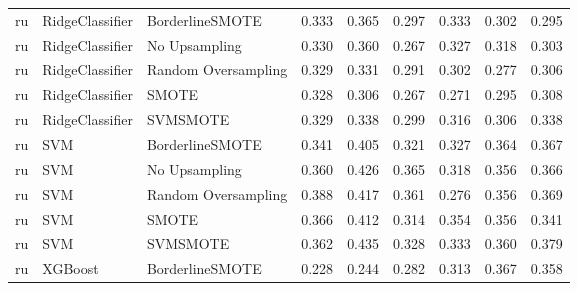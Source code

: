 \begin{tabular}{lllllllll}
      ru &              RidgeClassifier &     BorderlineSMOTE & 0.333 &                     0.365 &                 0.297 &                  0.333 &                                   0.302 &     0.295 \\
      ru &              RidgeClassifier &       No Upsampling & 0.330 &                     0.360 &                 0.267 &                  0.327 &                                   0.318 &     0.303 \\
      ru &              RidgeClassifier & Random Oversampling & 0.329 &                     0.331 &                 0.291 &                  0.302 &                                   0.277 &     0.306 \\
      ru &              RidgeClassifier &               SMOTE & 0.328 &                     0.306 &                 0.267 &                  0.271 &                                   0.295 &     0.308 \\
      ru &              RidgeClassifier &            SVMSMOTE & 0.329 &                     0.338 &                 0.299 &                  0.316 &                                   0.306 &     0.338 \\
      ru &                          SVM &     BorderlineSMOTE & 0.341 &                     0.405 &                 0.321 &                  0.327 &                                   0.364 &     0.367 \\
      ru &                          SVM &       No Upsampling & 0.360 &                     0.426 &                 0.365 &                  0.318 &                                   0.356 &     0.366 \\
      ru &                          SVM & Random Oversampling & 0.388 &                     0.417 &                 0.361 &                  0.276 &                                   0.356 &     0.369 \\
      ru &                          SVM &               SMOTE & 0.366 &                     0.412 &                 0.314 &                  0.354 &                                   0.356 &     0.341 \\
      ru &                          SVM &            SVMSMOTE & 0.362 &                     0.435 &                 0.328 &                  0.333 &                                   0.360 &     0.379 \\
      ru &                      XGBoost &     BorderlineSMOTE & 0.228 &                     0.244 &                 0.282 &                  0.313 &                                   0.367 &     0.358 \\

\end{tabular}
